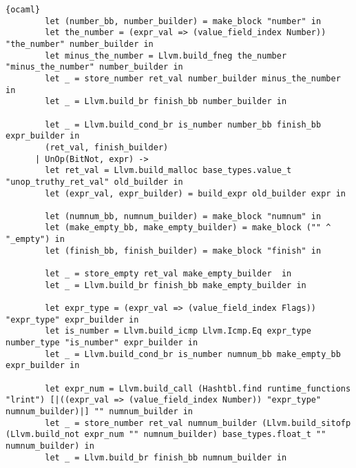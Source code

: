\begin{lstlisting}{ocaml}
        let (number_bb, number_builder) = make_block "number" in
        let the_number = (expr_val => (value_field_index Number)) "the_number" number_builder in
        let minus_the_number = Llvm.build_fneg the_number "minus_the_number" number_builder in
        let _ = store_number ret_val number_builder minus_the_number in
        let _ = Llvm.build_br finish_bb number_builder in

        let _ = Llvm.build_cond_br is_number number_bb finish_bb expr_builder in
        (ret_val, finish_builder)
      | UnOp(BitNot, expr) ->
        let ret_val = Llvm.build_malloc base_types.value_t "unop_truthy_ret_val" old_builder in
        let (expr_val, expr_builder) = build_expr old_builder expr in

        let (numnum_bb, numnum_builder) = make_block "numnum" in
        let (make_empty_bb, make_empty_builder) = make_block ("" ^ "_empty") in
        let (finish_bb, finish_builder) = make_block "finish" in

        let _ = store_empty ret_val make_empty_builder  in
        let _ = Llvm.build_br finish_bb make_empty_builder in

        let expr_type = (expr_val => (value_field_index Flags)) "expr_type" expr_builder in
        let is_number = Llvm.build_icmp Llvm.Icmp.Eq expr_type number_type "is_number" expr_builder in
        let _ = Llvm.build_cond_br is_number numnum_bb make_empty_bb expr_builder in

        let expr_num = Llvm.build_call (Hashtbl.find runtime_functions "lrint") [|((expr_val => (value_field_index Number)) "expr_type" numnum_builder)|] "" numnum_builder in
        let _ = store_number ret_val numnum_builder (Llvm.build_sitofp (Llvm.build_not expr_num "" numnum_builder) base_types.float_t "" numnum_builder) in
        let _ = Llvm.build_br finish_bb numnum_builder in


\end{lstlisting}
